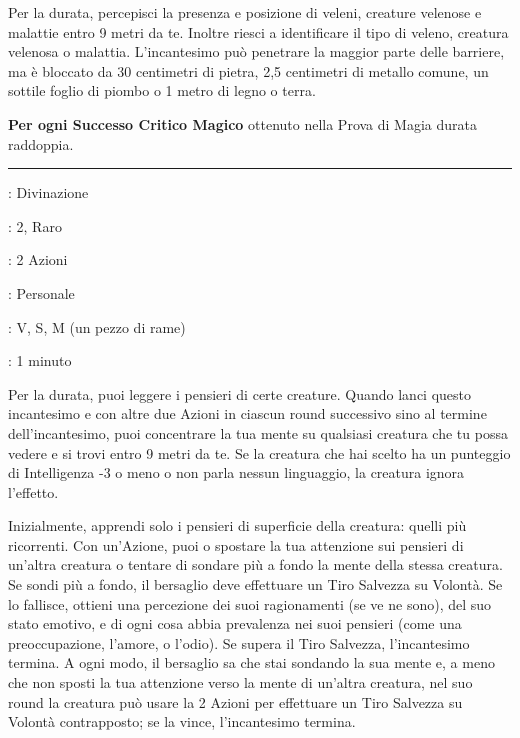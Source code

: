 \begin{multicols}{2}
Per la durata, percepisci la presenza e posizione di veleni, creature velenose e malattie entro 9 metri da te. Inoltre riesci a identificare il tipo di veleno, creatura velenosa o malattia. L'incantesimo può penetrare la maggior parte delle barriere, ma è bloccato da 30 centimetri di pietra, 2,5 centimetri di metallo comune, un sottile foglio di piombo o 1 metro di legno o terra.

\textbf{Per ogni Successo Critico Magico} ottenuto nella Prova di Magia durata raddoppia.

\smallskip\noindent\rule{\linewidth}{2pt} \hypertarget{Individuazione dei Pensieri}{}\smallskip{}
\noindent
\begin{description}[noitemsep, topsep=0pt, parsep=0pt, partopsep=0pt, leftmargin=0cm, labelwidth=2.8cm]
	\item[\textbf{Lista di Magia}]: Divinazione
	\item[\textbf{Livello}]: 2, Raro
	\item[\textbf{T. di Lancio}]: 2 Azioni
	\item[\textbf{Gittata}]: Personale
	\item[\textbf{Componenti}]: V, S, M (un pezzo di rame)
	\item[\textbf{Durata}]: 1 minuto
\end{description}

Per la durata, puoi leggere i pensieri di certe creature. Quando lanci questo incantesimo e con altre due Azioni in ciascun round successivo sino al termine dell'incantesimo, puoi concentrare la tua mente su qualsiasi creatura che tu possa vedere e si trovi entro 9 metri da te. Se la creatura che hai scelto ha un punteggio di Intelligenza -3 o meno o non parla nessun linguaggio, la creatura ignora l'effetto.

Inizialmente, apprendi solo i pensieri di superficie della creatura: quelli più ricorrenti. Con un'Azione, puoi o spostare la tua attenzione sui pensieri di un'altra creatura o tentare di sondare più a fondo la mente della stessa creatura. Se sondi più a fondo, il bersaglio deve effettuare un Tiro Salvezza su Volontà. Se lo fallisce, ottieni una percezione dei suoi ragionamenti (se ve ne sono), del suo stato emotivo, e di ogni cosa abbia prevalenza nei suoi pensieri (come una preoccupazione, l'amore, o l'odio). Se supera il Tiro Salvezza, l'incantesimo termina. A ogni modo, il bersaglio sa che stai sondando la sua mente e, a meno che non sposti la tua attenzione verso la mente di un'altra creatura, nel suo round la creatura può usare la 2 Azioni per effettuare un Tiro Salvezza su Volontà contrapposto; se la vince, l'incantesimo termina.


\end{multicols}
